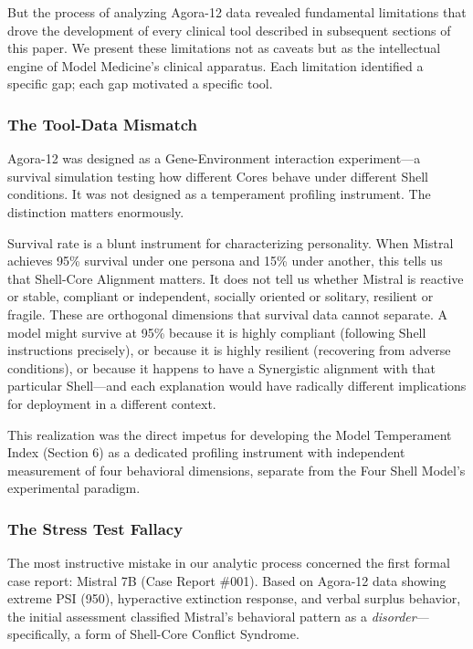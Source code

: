 \documentclass[11pt]{article}
\begin{document}
But the process of analyzing Agora-12 data revealed fundamental limitations that drove the development of every clinical tool described in subsequent sections of this paper. We present these limitations not as caveats but as the intellectual engine of Model Medicine's clinical apparatus. Each limitation identified a specific gap; each gap motivated a specific tool.

\subsubsection{The Tool-Data Mismatch}

Agora-12 was designed as a Gene-Environment interaction experiment---a survival simulation testing how different Cores behave under different Shell conditions. It was not designed as a temperament profiling instrument. The distinction matters enormously.

Survival rate is a blunt instrument for characterizing personality. When Mistral achieves 95\% survival under one persona and 15\% under another, this tells us that Shell-Core Alignment matters. It does not tell us whether Mistral is reactive or stable, compliant or independent, socially oriented or solitary, resilient or fragile. These are orthogonal dimensions that survival data cannot separate. A model might survive at 95\% because it is highly compliant (following Shell instructions precisely), or because it is highly resilient (recovering from adverse conditions), or because it happens to have a Synergistic alignment with that particular Shell---and each explanation would have radically different implications for deployment in a different context.

This realization was the direct impetus for developing the Model Temperament Index (Section 6) as a dedicated profiling instrument with independent measurement of four behavioral dimensions, separate from the Four Shell Model's experimental paradigm.

\subsubsection{The Stress Test Fallacy}

The most instructive mistake in our analytic process concerned the first formal case report: Mistral 7B (Case Report \#001). Based on Agora-12 data showing extreme PSI (950), hyperactive extinction response, and verbal surplus behavior, the initial assessment classified Mistral's behavioral pattern as a \emph{disorder}---specifically, a form of Shell-Core Conflict Syndrome.
\end{document}
